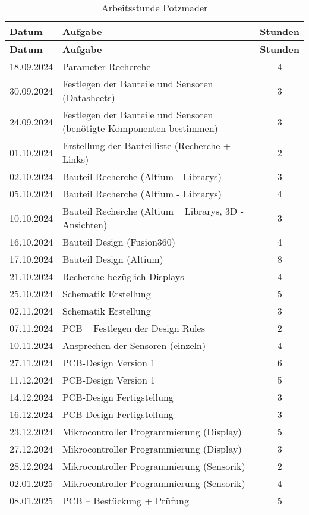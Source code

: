 \begin{longtable}{|l|p{9cm}|c|}
    \caption{Arbeitsstunde Potzmader} \\
    \hline
    \textbf{Datum} & \textbf{Aufgabe} & \textbf{Stunden} \\
    \hline
    \endfirsthead

    \hline
    \textbf{Datum} & \textbf{Aufgabe} & \textbf{Stunden} \\
    \hline
    \endhead
18.09.2024 & Parameter Recherche & 4 \\
30.09.2024 & Festlegen der Bauteile und Sensoren (Datasheets) & 3 \\
24.09.2024 & Festlegen der Bauteile und Sensoren (benötigte Komponenten bestimmen) & 3 \\
01.10.2024 & Erstellung der Bauteilliste (Recherche + Links) & 2 \\
02.10.2024 & Bauteil Recherche (Altium - Librarys) & 3 \\
05.10.2024 & Bauteil Recherche (Altium - Librarys) & 4 \\
10.10.2024 & Bauteil Recherche (Altium – Librarys, 3D - Ansichten) & 3 \\
16.10.2024 & Bauteil Design (Fusion360) & 4 \\
17.10.2024 & Bauteil Design (Altium) & 8 \\
21.10.2024 & Recherche bezüglich Displays & 4 \\
25.10.2024 & Schematik Erstellung & 5 \\
02.11.2024 & Schematik Erstellung & 3 \\
07.11.2024 & PCB – Festlegen der Design Rules & 2 \\
10.11.2024 & Ansprechen der Sensoren (einzeln) & 4 \\
27.11.2024 & PCB-Design Version 1 & 6 \\
11.12.2024 & PCB-Design Version 1 & 5 \\
14.12.2024 & PCB-Design Fertigstellung & 3 \\
16.12.2024 & PCB-Design Fertigstellung & 3 \\
23.12.2024 & Mikrocontroller Programmierung (Display) & 5 \\
27.12.2024 & Mikrocontroller Programmierung (Display) & 3 \\
28.12.2024 & Mikrocontroller Programmierung (Sensorik) & 2 \\
02.01.2025 & Mikrocontroller Programmierung (Sensorik) & 4 \\
08.01.2025 & PCB – Bestückung + Prüfung & 5 \\

\end{longtable}
